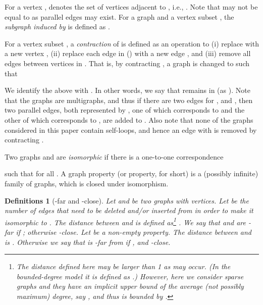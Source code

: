 \documentclass[11pt]{article}
\newtheorem{df}[thm]{Definitions}
\begin{document}
For a vertex ,  denotes the set of vertices adjacent to , 
i.e., . 
Note that  may not be equal to  
as parallel edges may exist. 
For a graph  
and a vertex subset , 
the {\em subgraph induced by } is 
defined as . 




For a vertex subset , 
a {\em contraction} of  is defined as 
an operation to 
(i) replace  with a new vertex , 
(ii) replace each edge  in  () with 
a new edge , and 
(iii) remove all edges between vertices in . 
That is, by contracting , 
a graph  is changed to  such that 

We identify the above  with . 
In other words, we say that  remains in  (as ). 
Note that the graphs are multigraphs, and thus if there are two edges  for ,  and , 
then two parallel edges, both represented by , 
one of which corresponds to  and 
the other of which corresponds to , are added to . 
Also note that none of the graphs considered in this paper contain self-loops, and hence 
an edge  with  is removed by contracting . 




Two graphs  and  
are {\em isomorphic} if there is a one-to-one correspondence 
 
such that  
for all . 
A graph property (or property, for short) is a (possibly infinite) 
family of graphs,  
which is closed under isomorphism.  




\begin{df}[-far and -close]
Let  and  be two graphs 
with  vertices. 
Let  be the number of edges 
that need to be deleted and/or 
inserted from  in order to make it isomorphic to . 
The distance between  and  is defined as\footnote{
The distance defined here may be larger than 1 
as  may occur. 
(In the bounded-degree model 
it is defined as .) 
However, here we consider sparse graphs 
and they have an implicit upper bound of the average (not possibly maximum) degree, 
say , and thus  is bounded by . 
} 
. 
We say that 
 and  are {\em -far} if 
; 
otherwise {\em -close}. 
Let  be a non-empty property. 
The distance between  and  is 
. Otherwise we say that 
 is {\em -far} from  if , 
and {\em -close}. 
\end{df}
\end{document}
